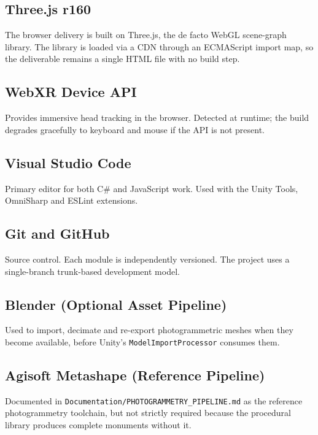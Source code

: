 \subsection{Three.js r160}

The browser delivery is built on Three.js, the de facto WebGL scene-graph library. The library is loaded via a CDN through an ECMAScript import map, so the deliverable remains a single HTML file with no build step.

\subsection{WebXR Device API}

Provides immersive head tracking in the browser. Detected at runtime; the build degrades gracefully to keyboard and mouse if the API is not present.

\subsection{Visual Studio Code}

Primary editor for both C\# and JavaScript work. Used with the Unity Tools, OmniSharp and ESLint extensions.

\subsection{Git and GitHub}

Source control. Each module is independently versioned. The project uses a single-branch trunk-based development model.

\subsection{Blender (Optional Asset Pipeline)}

Used to import, decimate and re-export photogrammetric meshes when they become available, before Unity's \texttt{ModelImportProcessor} consumes them.

\subsection{Agisoft Metashape (Reference Pipeline)}

Documented in \texttt{Documentation/PHOTOGRAMMETRY\_PIPELINE.md} as the reference photogrammetry toolchain, but not strictly required because the procedural library produces complete monuments without it.

